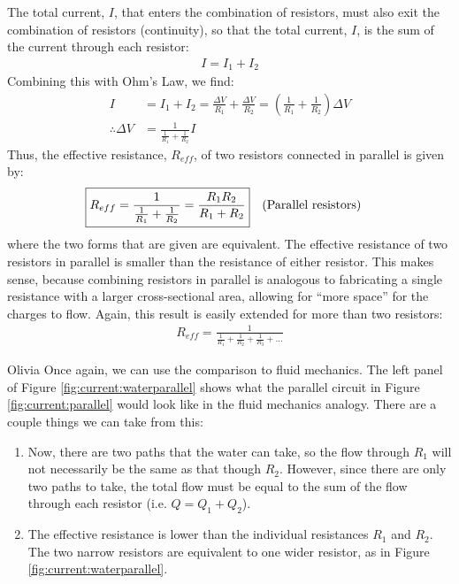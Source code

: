 The total current, $I$, that enters the combination of resistors, must also exit the combination of resistors (continuity), so that the total current, $I$, is the sum of the current through each resistor:
\begin{align*}
I=I_1+I_2
\end{align*}
Combining this with Ohm's Law, we find:
\begin{align*}
I&=I_1+I_2=\frac{\Delta V}{R_1}+\frac{\Delta V}{R_2}=\left( \frac{1}{R_1}+\frac{1}{R_2} \right)\Delta V\\
\therefore \Delta V &= \frac{1}{\frac{1}{R_1}+\frac{1}{R_2}}I
\end{align*}
Thus, the effective resistance, $R_{eff}$, of two resistors connected in parallel is given by:
\begin{align*}
\Aboxed{R_{eff}=\frac{1}{\frac{1}{R_1}+\frac{1}{R_2}}=\frac{R_1R_2}{R_1+R_2}}\quad \text{(Parallel resistors)}
\end{align*}
where the two forms that are given are equivalent. The effective resistance of two resistors in parallel is smaller than the resistance of either resistor. This makes sense, because combining resistors in parallel is analogous to fabricating a single resistance with a larger cross-sectional area, allowing for ``more space'' for the charges to flow. Again, this result is easily extended for more than two resistors:
\begin{align*}
R_{eff}=\frac{1}{\frac{1}{R_1}+\frac{1}{R_2}+\frac{1}{R_3}+\dots}
\end{align*}

\begin{studentOpinion}{Olivia}
Once again, we can use the comparison to fluid mechanics. The left panel of Figure \ref{fig:current:waterparallel} shows what the parallel circuit in Figure \ref{fig:current:parallel} would look like in the fluid mechanics analogy. There are a couple things we can take from this:
\begin{enumerate}
\item Now, there are two paths that the water can take, so the flow through $R_1$ will not necessarily be the same as that though $R_2$. However, since there are only two paths to take, the total flow must be equal to the sum of the flow through each resistor (i.e. $Q=Q_1+Q_2$).
\item The effective resistance is lower than the individual resistances $R_1$ and $R_2$. The two narrow resistors are equivalent to one wider resistor, as in Figure \ref{fig:current:waterparallel}.
\end{enumerate}
\end{studentOpinion}

